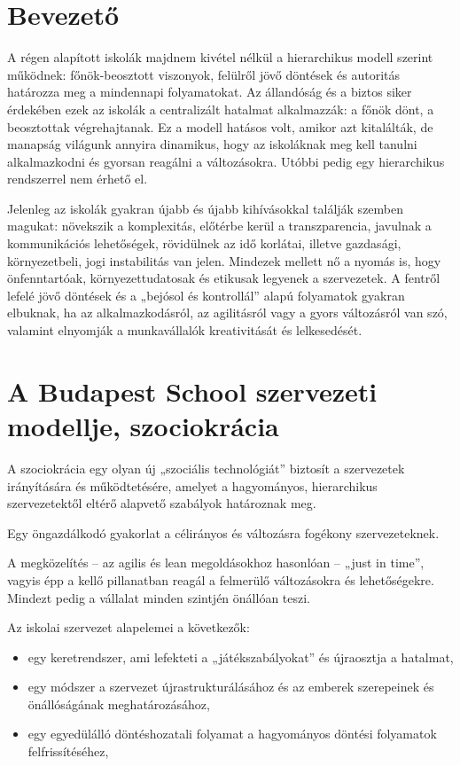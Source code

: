 \section{Bevezető}

A régen alapított iskolák majdnem kivétel nélkül a hierarchikus modell szerint működnek: főnök-beosztott viszonyok, felülről jövő döntések és autoritás határozza meg a mindennapi folyamatokat. Az állandóság és a biztos siker érdekében ezek az iskolák a centralizált hatalmat alkalmazzák: a főnök dönt, a beosztottak végrehajtanak. Ez a modell hatásos volt, amikor azt kitalálták, de manapság világunk annyira dinamikus, hogy az iskoláknak meg kell tanulni alkalmazkodni és gyorsan reagálni a változásokra. Utóbbi pedig egy hierarchikus rendszerrel nem érhető el.

Jelenleg az iskolák gyakran újabb és újabb kihívásokkal találják szemben magukat: növekszik a komplexitás, előtérbe kerül a transzparencia, javulnak a kommunikációs lehetőségek, rövidülnek az idő korlátai, illetve gazdasági, környezetbeli, jogi instabilitás van jelen. Mindezek mellett nő a nyomás is, hogy önfenntartóak, környezettudatosak és etikusak legyenek a szervezetek. A fentről lefelé jövő döntések és a „bejósol és kontrollál” alapú folyamatok gyakran elbuknak, ha az alkalmazkodásról, az agilitásról vagy a gyors változásról van szó, valamint elnyomják a munkavállalók kreativitását és lelkesedését. 

\section{A Budapest School szervezeti modellje, szociokrácia}

A szociokrácia egy olyan új „szociális technológiát” biztosít a szervezetek irányítására és működtetésére, amelyet a hagyományos, hierarchikus szervezetektől eltérő alapvető szabályok határoznak meg.

Egy öngazdálkodó gyakorlat a célirányos és változásra fogékony szervezeteknek.

A megközelítés – az agilis és lean megoldásokhoz hasonlóan – „just in time”, vagyis épp a kellő pillanatban reagál a felmerülő változásokra és lehetőségekre. Mindezt pedig a vállalat minden szintjén önállóan teszi.

Az iskolai szervezet alapelemei a következők:
\begin{itemize}
    \item egy keretrendszer, ami lefekteti a „játékszabályokat” és újraosztja a hatalmat,
    \item egy módszer a szervezet újrastrukturálásához és az emberek szerepeinek és önállóságának meghatározásához,
    \item egy egyedülálló döntéshozatali folyamat a hagyományos döntési folyamatok felfrissítéséhez,
\end{itemize}

